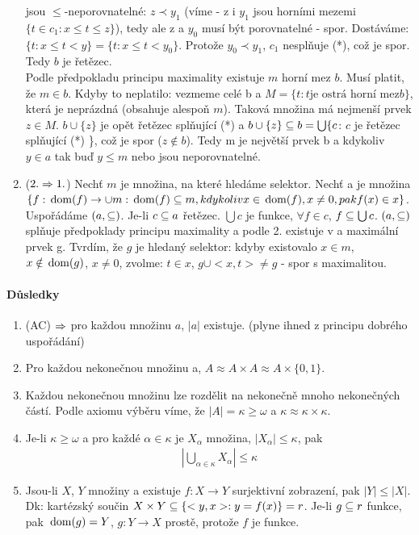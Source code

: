 \documentclass[a4paper,12pt,titlepage]{article}
\begin{document}
\begin{enumerate}
	jsou $\le$-neporovnatelné: $z \prec y_1$ (víme - z i $y_1$ jsou horními mezemi $\{t
	\in c_1: x \le t \le z \}$), tedy ale z a $y_0$ musí být porovnatelné - spor.
	Dostáváme: $\{ t: x \le t < y \} = \{ t: x \le t < y_0 \}$. Protože $y_0
	\prec y_1$, $c_1$ nesplňuje (*), což je spor. Tedy $b$ je řetězec. \\
	Podle předpokladu principu maximality existuje $m$ horní mez $b$. Musí
	platit, že $m \in b$. Kdyby to neplatilo: vezmeme celé b a $M = \{ t: t \text{je ostrá
	horní mez} b \}$, která je neprázdná (obsahuje alespoň $m$). Taková množina má
	nejmenší prvek $z \in M$. $b \cup \{z\}$ je opět řetězec splňující (*) a $b
	\cup \{z\} \subseteq b = \bigcup \{ c$: $c$ je řetězec splňující (*) \}, což je
	spor ($z \nin b$). Tedy m je největší prvek b a kdykoliv $y \in a$ tak buď $y
	\le m$ nebo jsou neporovnatelné.
	\item ($2. \Rightarrow 1.$) Nechť $m$ je množina, na které hledáme selektor. Nechť a
	je množina $\{ f: \operatorname*{\,dom}(f) \to \cup m: \operatorname*{\,dom}(f) \subseteq m, kdykoliv x \in
	\operatorname*{\,dom}(f), x \neq 0, pak f(x) \in x \}$. Uspořádáme $(a, \subseteq)$. Je-li $c \subseteq a$
	řetězec. $\bigcup c$ je funkce, $\forall f \in c$, $f \subseteq \bigcup c$. $(a,
	\subseteq)$ splňuje předpoklady principu maximality a podle 2. existuje v a
	maximální prvek g. Tvrdím, že $g$ je hledaný selektor: kdyby existovalo $x \in
	m$, $x \notin \operatorname*{\,dom}(g)$, $x \neq 0$, zvolme: $t \in x$, $g \cup <x,t> \neq g$ - spor s
	maximalitou.
\end{enumerate}
\paragraph{Důsledky}
\begin{enumerate}
	\item (AC) $\Rightarrow$ pro každou množinu $a$, $|a|$ existuje. (plyne ihned z principu
	dobrého uspořádání)
	\item Pro každou nekonečnou množinu a, $A \approx A \times A \approx A \times
	\{ 0, 1 \}$. 
	\item Každou nekonečnou množinu lze rozdělit na nekonečně mnoho nekonečných
	částí. Podle axiomu výběru víme, že $|A| = \kappa \ge \omega$ a $\kappa
	\approx \kappa \times \kappa$.
	\item Je-li $\kappa \ge \omega$ a pro každé $\alpha \in \kappa$ je
	$X_\alpha$	množina, $|X_\alpha|\le \kappa$, pak
	\begin{align}
		\left|\bigcup_{\alpha\in\kappa} X_\alpha \right| \le \kappa
	\end{align}
	\item Jsou-li $X$, $Y$ množiny a existuje $f: X \to Y$ surjektivní
	zobrazení, pak $|Y| \le |X|$. Dk: kartézský součin $X \times Y \subseteq \{
	<y,x> : y = f(x) \} = r$. Je-li $g \subseteq r$ funkce, pak $\operatorname*{\,dom}(g) = Y$, $g: Y
	\to X$ prostě, protože $f$ je funkce.
\end{enumerate}
\end{document}
